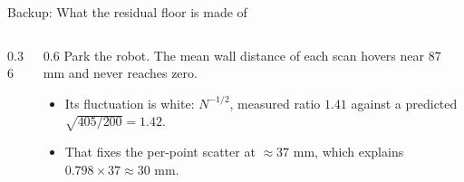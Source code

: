 \documentclass[10pt, aspectratio=169]{beamer}
\begin{document}
\begin{frame}{Backup: What the residual floor is made of}
  \begin{columns}[c]
    \begin{column}{0.36\textwidth}
      \centering
    \end{column}
    \begin{column}{0.6\textwidth}
      Park the robot. The mean wall distance of each scan hovers near 87 mm and never reaches zero.
      \begin{itemize}\small
        \item Its fluctuation is white: $N^{-1/2}$, measured ratio $1.41$ against a predicted
              $\sqrt{405/200}=1.42$.
        \item That fixes the per-point scatter at $\approx 37$ mm, which explains
              $0.798\times 37\approx 30$ mm.
      \end{itemize}
    \end{column}
  \end{columns}
\end{frame}
\end{document}
